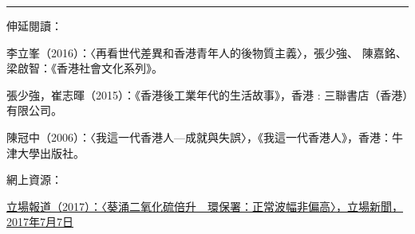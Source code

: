 \rule[-10pt]{15cm}{0.05em}

伸延閱讀：

李立峯（2016）：〈再看世代差異和香港青年人的後物質主義〉，張少強、 陳嘉銘、梁啟智：《香港社會文化系列》。

張少強，崔志暉（2015）：《香港後工業年代的生活故事》，香港 : 三聯書店（香港）有限公司。

陳冠中（2006）：〈我這一代香港人—成就與失誤〉，《我這一代香港人》，香港：牛津大學出版社。

網上資源：

\href{https://thestandnews.com/politics/遼寧號污染-葵涌二氧化硫倍升-環保署-正常波幅非偏高/}{立場報道（2017）：〈葵涌二氧化硫倍升　環保署：正常波幅非偏高〉，立場新聞，2017年7月7日}